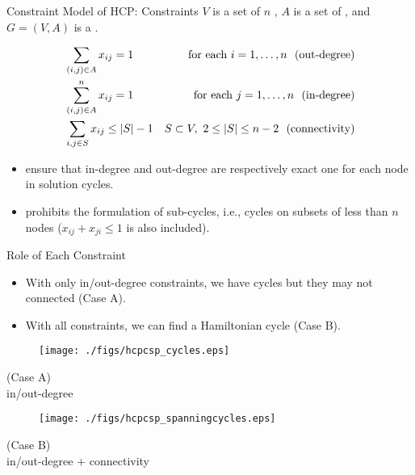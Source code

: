 \documentclass{beamer}
\begin{document}
\begin{frame}{Constraint Model of HCP: Constraints}%
$V$ is a set of $n$ , $A$ is a set of , and $G = (V, A)$ is a
. \\

\begin{block}{}
\vspace{-1em}
\begin{align}
&\sum_{(i,j) \in A} x_{ij}=1 & ~\text{for each}~ i=1,\ldots,n\notag
 ~~\text{(out-degree)}\\
&\sum_{(i,j) \in A}^{n} x_{ij}=1 & ~\text{for each}~ j=1,\ldots,n\notag
~~\text{(in-degree)}\\
&\sum_{i,j \in S} x_{ij} \le |S| - 1 & S \subset V,~ 2\le |S| \le
n-2 \notag ~~\text{(connectivity)}
\end{align}
\end{block}
\begin{itemize}
\item {} ensure that in-degree and
  out-degree are respectively exact one for each node in solution cycles. 
\item {} prohibits the formulation of sub-cycles, i.e.,
  cycles on subsets of less than $n$ nodes ($x_{ij} + x_{ji} \le 1$ is also included).
\end{itemize}
\end{frame}

\begin{frame}{Role of Each Constraint}
\begin{itemize}
\item With only in/out-degree constraints, we have cycles but they may not connected (Case A). 
\item With all constraints, we can find a Hamiltonian cycle (Case B).
\end{itemize}

\begin{center}
\begin{minipage}[c]{0.45\textwidth}
  \begin{figure}
    \centering
    \texttt{[image: ./figs/hcpcsp\_cycles.eps]}
  \end{figure}
\vspace{-1em}
  \centering
(Case A)\\
in/out-degree
\end{minipage}
\begin{minipage}[c]{0.45\textwidth}
  \begin{figure}
    \centering
    \texttt{[image: ./figs/hcpcsp\_spanningcycles.eps]}
  \end{figure}
\vspace{-1em}
  \centering
(Case B)\\
in/out-degree $+$ connectivity
\end{minipage}
\end{center}
\end{frame}
\end{document}
